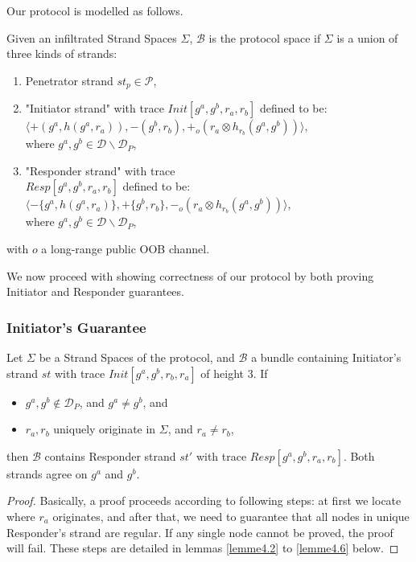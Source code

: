 Our protocol is modelled as follows. 

\begin{Definition}
Given an infiltrated Strand Spaces $\Sigma$, $\mathcal{B}$ is the protocol space if $\Sigma$ is a union of three kinds of strands:
\begin{enumerate}
\item Penetrator strand $st_p \in \mathcal{P}$,
\item "Initiator strand" with trace {\small $Init[g^a,g^b,r_a,r_b]$} defined to be: \\ 
 {\small $\langle +(g^a,h(g^a,r_a)),-(g^b,r_b),+_o(r_a \otimes h_{r_b}(g^a,g^b)) \rangle$, \\ where $g^a,g^b \in \mathcal{D} \backslash \mathcal{D}_P$,}
\item "Responder strand" with trace\\
 {\small $Resp[g^a,g^b,r_a,r_b]$} defined to be: {\small $\langle -\{g^a,h(g^a,r_a)\},+\{g^b,r_b\}, -_o(r_a \otimes h_{r_b}(g^a,g^b)) \rangle$, \\ where $g^a,g^b \in \mathcal{D} \backslash \mathcal{D}_P$,}
\end{enumerate}
with $o$ a long-range public OOB channel.
\end{Definition}

We now proceed with showing correctness of our protocol by both proving Initiator and Responder guarantees.

\subsubsection{Initiator's Guarantee}

\begin{Proposition}
Let $\Sigma$ be a Strand Spaces of the protocol, and $\mathcal{B}$ a bundle containing Initiator's strand $st$ with trace $Init[g^a,g^b,r_b,r_a]$ of height 3. If
 \begin{itemize}
 \item $g^a,g^b \not\in \mathcal{D}_P$, and $g^a \not= g^b$, and
 \item $r_a,r_b$ uniquely originate in $\Sigma$, and $r_a \not= r_b$,
 \end{itemize}
then $\mathcal{B}$ contains Responder strand $st'$ with trace $Resp[g^a,g^b,r_a,r_b]$. Both strands agree on $g^a$ and $g^b$.
\end{Proposition}

\begin{proof}
Basically, a proof proceeds according to following steps: at first we locate where $r_a$ originates, and after that, we need to guarantee that all nodes in unique Responder's strand are regular. If any single node cannot be proved, the proof will fail. These steps are detailed in lemmas \ref{lemme4.2} to \ref{lemme4.6} below.
\end{proof}

